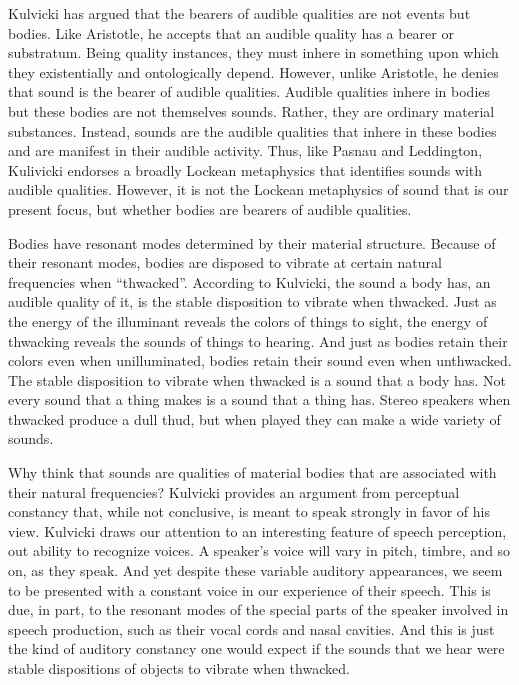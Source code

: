 \documentclass[12pt]{article}
\begin{document}
Kulvicki has argued that the bearers of audible qualities are not events but bodies. Like Aristotle, he accepts that an audible quality has a bearer or substratum. Being quality instances, they must inhere in something upon which they existentially and ontologically depend. However, unlike Aristotle, he denies that sound is the bearer of audible qualities. Audible qualities inhere in bodies but these bodies are not themselves sounds. Rather, they are ordinary material substances. Instead, sounds are the audible qualities that inhere in these bodies and are manifest in their audible activity. Thus, like Pasnau and Leddington, Kulivicki endorses a broadly Lockean metaphysics that identifies sounds with audible qualities. However, it is not the Lockean metaphysics of sound that is our present focus, but whether bodies are bearers of audible qualities.

Bodies have resonant modes determined by their material structure. Because of their resonant modes, bodies are disposed to vibrate at certain natural frequencies when “thwacked”. According to Kulvicki, the sound a body has, an audible quality of it, is the stable disposition to vibrate when thwacked. Just as the energy of the illuminant reveals the colors of things to sight, the energy of thwacking reveals the sounds of things to hearing. And just as bodies retain their colors even when unilluminated, bodies retain their sound even when unthwacked. The stable disposition to vibrate when thwacked is a sound that a body has. Not every sound that a thing makes is a sound that a thing has. Stereo speakers when thwacked produce a dull thud, but when played they can make a wide variety of sounds.

Why think that sounds are qualities of material bodies that are associated with their natural frequencies? Kulvicki provides an argument from perceptual constancy that, while not conclusive, is meant to speak strongly in favor of his view. Kulvicki draws our attention to an interesting feature of speech perception, out ability to recognize voices. A speaker’s voice will vary in pitch, timbre, and so on, as they speak. And yet despite these variable auditory appearances, we seem to be presented with a constant voice in our experience of their speech. This is due, in part, to the resonant modes of the special parts of the speaker involved in speech production, such as their vocal cords and nasal cavities. And this is just the kind of auditory constancy one would expect if the sounds that we hear were stable dispositions of objects to vibrate when thwacked.
\end{document}
